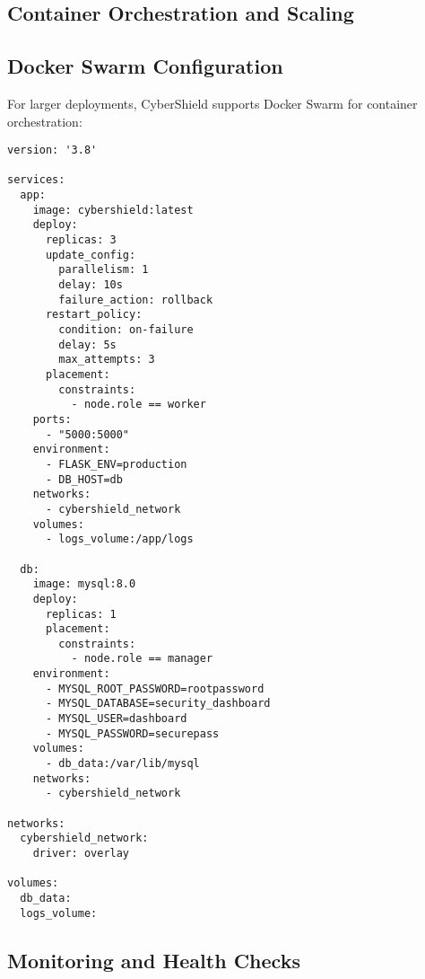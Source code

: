 \documentclass[12pt,a4paper]{report}
\begin{document}
\subsection{Container Orchestration and Scaling}

\subsection{Docker Swarm Configuration}

For larger deployments, CyberShield supports Docker Swarm for container orchestration:

\begin{lstlisting}[style=dockerstyle, caption=Docker Swarm Configuration]
version: '3.8'

services:
  app:
    image: cybershield:latest
    deploy:
      replicas: 3
      update_config:
        parallelism: 1
        delay: 10s
        failure_action: rollback
      restart_policy:
        condition: on-failure
        delay: 5s
        max_attempts: 3
      placement:
        constraints:
          - node.role == worker
    ports:
      - "5000:5000"
    environment:
      - FLASK_ENV=production
      - DB_HOST=db
    networks:
      - cybershield_network
    volumes:
      - logs_volume:/app/logs

  db:
    image: mysql:8.0
    deploy:
      replicas: 1
      placement:
        constraints:
          - node.role == manager
    environment:
      - MYSQL_ROOT_PASSWORD=rootpassword
      - MYSQL_DATABASE=security_dashboard
      - MYSQL_USER=dashboard
      - MYSQL_PASSWORD=securepass
    volumes:
      - db_data:/var/lib/mysql
    networks:
      - cybershield_network

networks:
  cybershield_network:
    driver: overlay
    
volumes:
  db_data:
  logs_volume:
\end{lstlisting}

\subsection{Monitoring and Health Checks}
\end{document}
